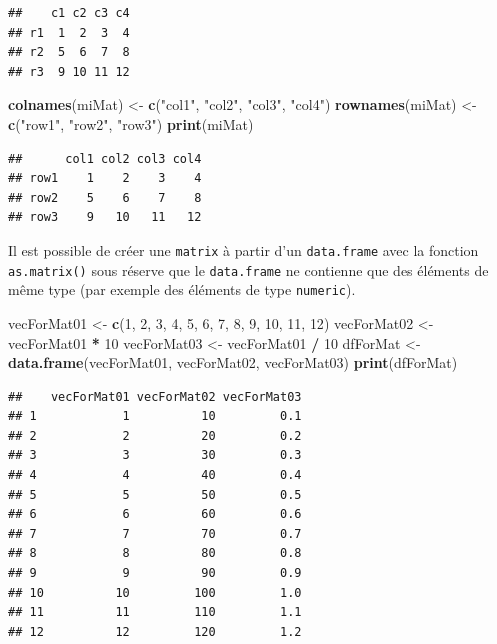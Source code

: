 \documentclass[
]{book}
\newenvironment{Shaded}{\begin{snugshade}}{\end{snugshade}}
\newcommand{\DecValTok}[1]{\textcolor[rgb]{0.00,0.00,0.81}{#1}}
\newcommand{\KeywordTok}[1]{\textcolor[rgb]{0.13,0.29,0.53}{\textbf{#1}}}
\newcommand{\NormalTok}[1]{#1}
\newcommand{\OperatorTok}[1]{\textcolor[rgb]{0.81,0.36,0.00}{\textbf{#1}}}
\newcommand{\StringTok}[1]{\textcolor[rgb]{0.31,0.60,0.02}{#1}}
\begin{document}
\begin{verbatim}
##    c1 c2 c3 c4
## r1  1  2  3  4
## r2  5  6  7  8
## r3  9 10 11 12
\end{verbatim}

\begin{Shaded}
\begin{Highlighting}[]
\KeywordTok{colnames}\NormalTok{(miMat) <-}\StringTok{ }\KeywordTok{c}\NormalTok{(}\StringTok{"col1"}\NormalTok{, }\StringTok{"col2"}\NormalTok{, }\StringTok{"col3"}\NormalTok{, }\StringTok{"col4"}\NormalTok{)}
\KeywordTok{rownames}\NormalTok{(miMat) <-}\StringTok{ }\KeywordTok{c}\NormalTok{(}\StringTok{"row1"}\NormalTok{, }\StringTok{"row2"}\NormalTok{, }\StringTok{"row3"}\NormalTok{)}
\KeywordTok{print}\NormalTok{(miMat)}
\end{Highlighting}
\end{Shaded}

\begin{verbatim}
##      col1 col2 col3 col4
## row1    1    2    3    4
## row2    5    6    7    8
## row3    9   10   11   12
\end{verbatim}

Il est possible de créer une \texttt{matrix} à partir d'un \texttt{data.frame} avec la fonction \texttt{as.matrix()} sous réserve que le \texttt{data.frame} ne contienne que des éléments de même type (par exemple des éléments de type \texttt{numeric}).

\begin{Shaded}
\begin{Highlighting}[]
\NormalTok{vecForMat01 <-}\StringTok{ }\KeywordTok{c}\NormalTok{(}\DecValTok{1}\NormalTok{, }\DecValTok{2}\NormalTok{, }\DecValTok{3}\NormalTok{, }\DecValTok{4}\NormalTok{, }\DecValTok{5}\NormalTok{, }\DecValTok{6}\NormalTok{, }\DecValTok{7}\NormalTok{, }\DecValTok{8}\NormalTok{, }\DecValTok{9}\NormalTok{, }\DecValTok{10}\NormalTok{, }\DecValTok{11}\NormalTok{, }\DecValTok{12}\NormalTok{)}
\NormalTok{vecForMat02 <-}\StringTok{ }\NormalTok{vecForMat01 }\OperatorTok{*}\StringTok{ }\DecValTok{10}
\NormalTok{vecForMat03 <-}\StringTok{ }\NormalTok{vecForMat01 }\OperatorTok{/}\StringTok{ }\DecValTok{10}
\NormalTok{dfForMat <-}\StringTok{ }\KeywordTok{data.frame}\NormalTok{(vecForMat01, vecForMat02, vecForMat03)}
\KeywordTok{print}\NormalTok{(dfForMat)}
\end{Highlighting}
\end{Shaded}

\begin{verbatim}
##    vecForMat01 vecForMat02 vecForMat03
## 1            1          10         0.1
## 2            2          20         0.2
## 3            3          30         0.3
## 4            4          40         0.4
## 5            5          50         0.5
## 6            6          60         0.6
## 7            7          70         0.7
## 8            8          80         0.8
## 9            9          90         0.9
## 10          10         100         1.0
## 11          11         110         1.1
## 12          12         120         1.2
\end{verbatim}
\end{document}
